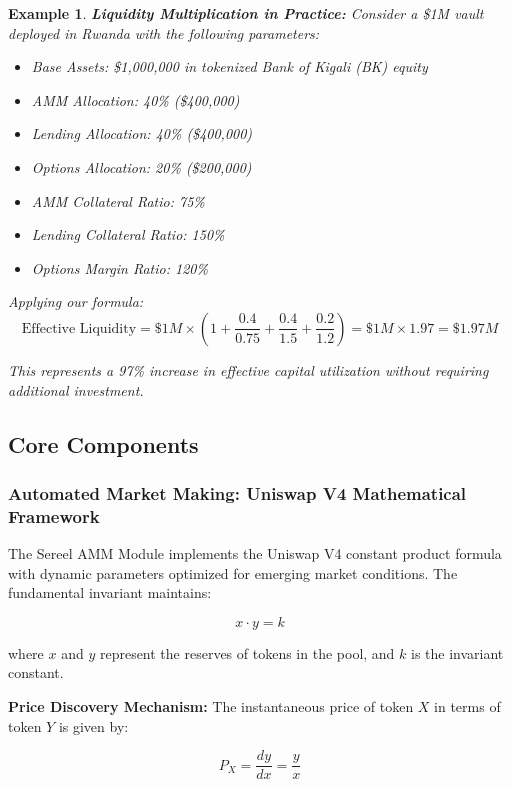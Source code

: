 \documentclass[12pt]{article}
\newtheorem{example}{Example}
\begin{document}
\begin{example}
\textbf{Liquidity Multiplication in Practice:} Consider a \$1M vault deployed in Rwanda with the following parameters:

\begin{itemize}
  \item Base Assets: \$1,000,000 in tokenized Bank of Kigali (BK) equity
  \item AMM Allocation: 40\% (\$400,000)
  \item Lending Allocation: 40\% (\$400,000)
  \item Options Allocation: 20\% (\$200,000)
  \item AMM Collateral Ratio: 75\%
  \item Lending Collateral Ratio: 150\%
  \item Options Margin Ratio: 120\%
\end{itemize}

Applying our formula:
$$\text{Effective Liquidity} = \$1M \times \left(1 + \frac{0.4}{0.75} + \frac{0.4}{1.5} + \frac{0.2}{1.2}\right) = \$1M \times 1.97 = \$1.97M$$

This represents a 97\% increase in effective capital utilization without requiring additional investment.
\end{example}

\subsection{Core Components}

\subsubsection{Automated Market Making: Uniswap V4 Mathematical Framework}

The Sereel AMM Module implements the Uniswap V4 constant product formula with dynamic parameters optimized for emerging market conditions. The fundamental invariant maintains:

\begin{equation}
x \cdot y = k
\end{equation}

where $x$ and $y$ represent the reserves of tokens in the pool, and $k$ is the invariant constant.

\textbf{Price Discovery Mechanism:}
The instantaneous price of token $X$ in terms of token $Y$ is given by:

\begin{equation}
P_X = \frac{dy}{dx} = \frac{y}{x}
\end{equation}
\end{document}
